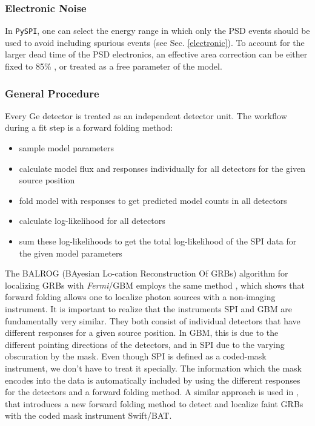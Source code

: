 \documentclass[twocolumn,traditabstract]{aa}
\begin{document}
\subsubsection{Electronic Noise}

In {\tt PySPI}, one can select the energy range in which only the PSD events should be used to avoid including spurious events (see Sec. \ref{electronic}). To account for the larger dead time of the PSD electronics, an effective area correction can be either fixed to 85\% \citep{spi_electronic_noise}, or treated as a free parameter of the model.

\subsubsection{General Procedure}

Every Ge detector is treated as an independent detector unit. The workflow during a fit step is a forward folding method:
\begin{itemize}
  \vspace{-0.2cm}
  \item sample model parameters
  \item calculate model flux and responses individually for all detectors for the given source position
  \item fold model with responses to get predicted model counts in all detectors
  \item calculate log-likelihood for all detectors
  \item sum these log-likelihoods to get the total log-likelihood of the SPI data for the given model parameters
\end{itemize}

\noindent
The BALROG (BAyesian Lo-cation Reconstruction Of GRBs) algorithm for localizing GRBs with \textit{Fermi}/GBM employs the same method \citep{balrog}, which shows that forward folding allows one to localize photon sources with a non-imaging instrument. It is important to realize that the instruments SPI and GBM are fundamentally very similar. They both consist of individual detectors that have different responses for a given source position. In GBM, this is due to the different pointing directions of the detectors, and in SPI due to the varying obscuration by the mask. Even though SPI is defined as a coded-mask instrument, we don't have to treat it specially. The information which the mask encodes into the data is automatically included by using the different responses for the detectors and a forward folding method. A similar approach is used in \citet{Tohuvavohu-2021}, that introduces a new forward folding method to detect and localize faint GRBs with the coded mask instrument Swift/BAT.
\end{document}
